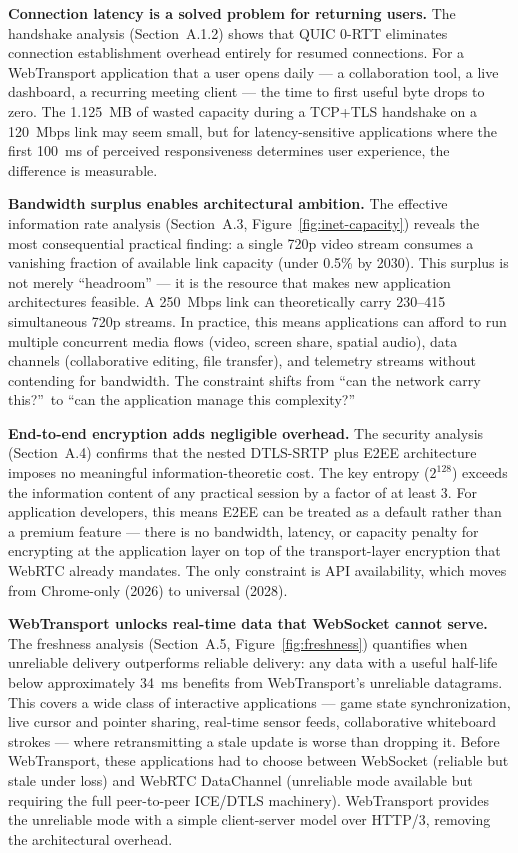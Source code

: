 \textbf{Connection latency is a solved problem for returning users.}
The handshake analysis (Section~A.1.2) shows that QUIC 0-RTT eliminates
connection establishment overhead entirely for resumed connections. For a
WebTransport application that a user opens daily --- a collaboration tool,
a live dashboard, a recurring meeting client --- the time to first useful
byte drops to zero. The 1.125~MB of wasted capacity during a TCP+TLS
handshake on a 120~Mbps link may seem small, but for latency-sensitive
applications where the first 100~ms of perceived responsiveness determines
user experience, the difference is measurable.

\textbf{Bandwidth surplus enables architectural ambition.}
The effective information rate analysis (Section~A.3,
Figure~\ref{fig:inet-capacity}) reveals the most consequential practical
finding: a single 720p video stream consumes a vanishing fraction of
available link capacity (under 0.5\% by 2030). This surplus is not merely
``headroom'' --- it is the resource that makes new application architectures
feasible. A 250~Mbps link can theoretically carry 230--415 simultaneous 720p
streams. In practice, this means applications can afford to run multiple
concurrent media flows (video, screen share, spatial audio), data channels
(collaborative editing, file transfer), and telemetry streams without
contending for bandwidth. The constraint shifts from ``can the network carry
this?''\ to ``can the application manage this complexity?''

\textbf{End-to-end encryption adds negligible overhead.}
The security analysis (Section~A.4) confirms that the nested DTLS-SRTP plus
E2EE architecture imposes no meaningful information-theoretic cost. The key
entropy ($2^{128}$) exceeds the information content of any practical session
by a factor of at least 3. For application developers, this means E2EE can
be treated as a default rather than a premium feature --- there is no
bandwidth, latency, or capacity penalty for encrypting at the application
layer on top of the transport-layer encryption that WebRTC already mandates.
The only constraint is API availability, which moves from Chrome-only (2026)
to universal (2028).

\textbf{WebTransport unlocks real-time data that WebSocket cannot serve.}
The freshness analysis (Section~A.5, Figure~\ref{fig:freshness}) quantifies
when unreliable delivery outperforms reliable delivery: any data with a
useful half-life below approximately 34~ms benefits from WebTransport's
unreliable datagrams. This covers a wide class of interactive applications
--- game state synchronization, live cursor and pointer sharing, real-time
sensor feeds, collaborative whiteboard strokes --- where retransmitting a
stale update is worse than dropping it. Before WebTransport, these
applications had to choose between WebSocket (reliable but stale under loss)
and WebRTC DataChannel (unreliable mode available but requiring the full
peer-to-peer ICE/DTLS machinery). WebTransport provides the unreliable
mode with a simple client-server model over HTTP/3, removing the
architectural overhead.

